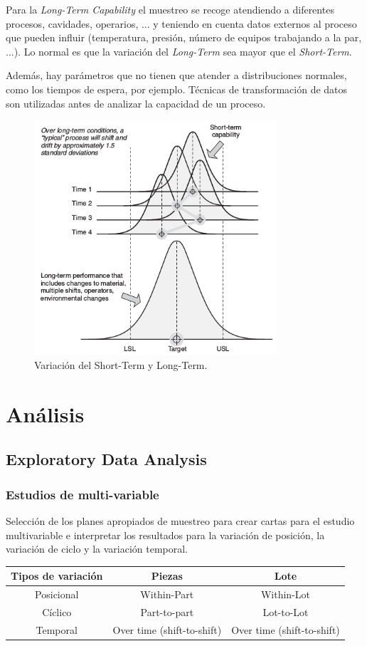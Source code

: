 \documentclass[oneside]{book}
\begin{document}
Para la \textit{Long-Term Capability} el muestreo se recoge atendiendo a diferentes procesos, cavidades, operarios, ... y teniendo en cuenta datos externos al proceso que pueden influir (temperatura, presión, número de equipos trabajando a la par, ...). Lo normal es que la variación del \textit{Long-Term} sea mayor que el \textit{Short-Term}.

Además, hay parámetros que no tienen que atender a distribuciones normales, como los tiempos de espera, por ejemplo. Técnicas de transformación de datos son utilizadas antes de analizar la capacidad de un proceso.

\begin{figure}[H]
	\centering
	\includegraphics[width=90mm]{imagenes/ShortTermVsLongTerm.png}
	\caption{Variación del Short-Term y Long-Term.}
	\label{fig:ShortTermVsLongTerm}
\end{figure}

\pagebreak[4]
\part{Análisis}

\chapter{Exploratory Data Analysis}

\section{Estudios de multi-variable}

Selección de los planes apropiados de muestreo para crear cartas para el estudio multivariable e interpretar los resultados para la variación de posición, la variación de ciclo y la variación temporal.
\begin{center}
\begin{tabular}{|c|c|c|}
	\hline Tipos de variación & Piezas & Lote \\ 
	\hline Posicional & Within-Part & Within-Lot \\ 
	\hline Cíclico & Part-to-part & Lot-to-Lot \\ 
	\hline Temporal & Over time (shift-to-shift) & Over time (shift-to-shift) \\ 
	\hline 
\end{tabular} 
\end{center}
\end{document}
